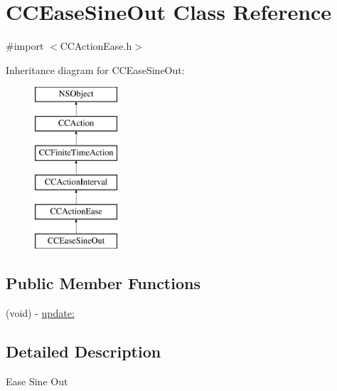 \hypertarget{interface_c_c_ease_sine_out}{\section{C\-C\-Ease\-Sine\-Out Class Reference}
\label{interface_c_c_ease_sine_out}
}


{\ttfamily \#import $<$C\-C\-Action\-Ease.\-h$>$}

Inheritance diagram for C\-C\-Ease\-Sine\-Out\-:\begin{figure}[H]
\begin{center}
\leavevmode
\includegraphics[height=6.000000cm]{interface_c_c_ease_sine_out}
\end{center}
\end{figure}
\subsection*{Public Member Functions}
\begin{DoxyCompactItemize}
\item 
(void) -\/ \hyperlink{interface_c_c_ease_sine_out_a5ceb9465c34739755403ed5457887df5}{update\-:}
\end{DoxyCompactItemize}


\subsection{Detailed Description}
Ease Sine Out 

